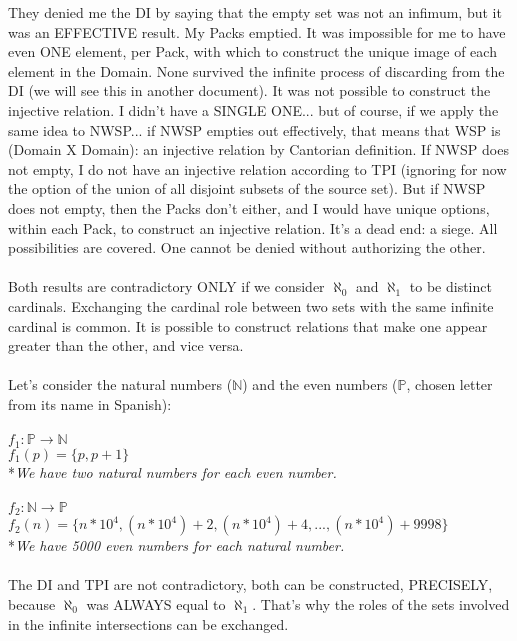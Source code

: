 	\noindent
	They denied me the DI by saying that the empty set was not an infimum, but it was an EFFECTIVE result. My Packs emptied. It was impossible for me to have even ONE element, per Pack, with which to construct the unique image of each element in the Domain. None survived the infinite process of discarding from the DI (we will see this in another document). It was not possible to construct the injective relation. I didn't have a SINGLE ONE... but of course, if we apply the same idea to NWSP... if NWSP empties out effectively, that means that WSP is (Domain X Domain): an injective relation by Cantorian definition. If NWSP does not empty, I do not have an injective relation according to TPI (ignoring for now the option of the union of all disjoint subsets of the source set). But if NWSP does not empty, then the Packs don't either, and I would have unique options, within each Pack, to construct an injective relation. It's a dead end: a siege. All possibilities are covered. One cannot be denied without authorizing the other.\\\\
	
	\noindent
	Both results are contradictory ONLY if we consider $\aleph_{0}$ and $\aleph_{1}$ to be distinct cardinals. Exchanging the cardinal role between two sets with the same infinite cardinal is common. It is possible to construct relations that make one appear greater than the other, and vice versa.\\\\
	
	\noindent
	Let's consider the natural numbers ($\mathbb{N}$) and the even numbers ($\mathbb{P}$, chosen letter from its name in Spanish):\\\\
	$f_{1}: \mathbb{P} \longrightarrow \mathbb{N}$\\
	$f_{1}(p) = \{p, p+1\}$\\
	*\textit{We have two natural numbers for each even number.}\\\\
	$f_{2}: \mathbb{N} \longrightarrow \mathbb{P}$\\
	$f_{2}(n) = \{n * 10^{4}, (n * 10^{4})+2, (n * 10^{4})+4, ... , (n * 10^{4})+9998 \}$\\
	*\textit{We have 5000 even numbers for each natural number.}\\\\
	
	\noindent
	The DI and TPI are not contradictory, both can be constructed, PRECISELY, because $\aleph_{0}$ was ALWAYS equal to $\aleph_{1}$. That's why the roles of the sets involved in the infinite intersections can be exchanged.\\\\
	
